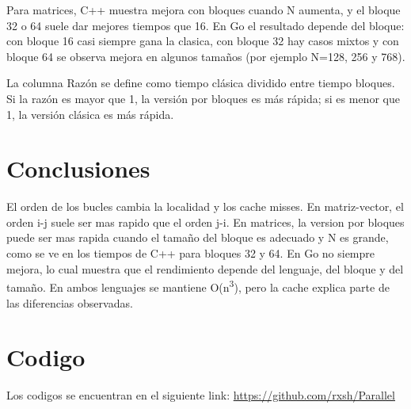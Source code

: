 \documentclass[11pt]{article}
\begin{document}
Para matrices, C++ muestra mejora con bloques cuando N aumenta, y el bloque 32 o 64 suele dar mejores tiempos que 16. En Go el resultado depende del bloque: con bloque 16 casi siempre gana la clasica, con bloque 32 hay casos mixtos y con bloque 64 se observa mejora en algunos tamaños (por ejemplo N=128, 256 y 768).

La columna Razón se define como tiempo clásica dividido entre tiempo bloques. Si la razón es mayor que 1, la versión por bloques es más rápida; si es menor que 1, la versión clásica es más rápida.

\section*{Conclusiones}
El orden de los bucles cambia la localidad y los cache misses. En matriz-vector, el orden i-j suele ser mas rapido que el orden j-i. En matrices, la version por bloques puede ser mas rapida cuando el tamaño del bloque es adecuado y N es grande, como se ve en los tiempos de C++ para bloques 32 y 64. En Go no siempre mejora, lo cual muestra que el rendimiento depende del lenguaje, del bloque y del tamaño. En ambos lenguajes se mantiene O(n\textsuperscript{3}), pero la cache explica parte de las diferencias observadas.

\section*{Codigo}

Los codigos se encuentran en el siguiente link: \url{https://github.com/rxsh/Parallel} 
\end{document}
